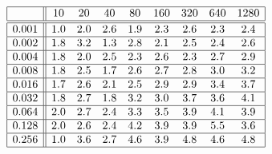 \[
\begin{array}{|c||cccccccc|}
\hline 
& 10 & 20 & 40 & 80 & 160 & 320 & 640 & 1280\\
\hline \hline 
0.001 & 1.0 & 2.0 & 2.6 & 1.9 & 2.3 & 2.6 & 2.3 & 2.4 \\ \hline 
0.002 & 1.8 & 3.2 & 1.3 & 2.8 & 2.1 & 2.5 & 2.4 & 2.6 \\ \hline 
0.004 & 1.8 & 2.0 & 2.5 & 2.3 & 2.6 & 2.3 & 2.7 & 2.9 \\ \hline 
0.008 & 1.8 & 2.5 & 1.7 & 2.6 & 2.7 & 2.8 & 3.0 & 3.2 \\ \hline 
0.016 & 1.7 & 2.6 & 2.1 & 2.5 & 2.9 & 2.9 & 3.4 & 3.7 \\ \hline 
0.032 & 1.8 & 2.7 & 1.8 & 3.2 & 3.0 & 3.7 & 3.6 & 4.1 \\ \hline 
0.064 & 2.0 & 2.7 & 2.4 & 3.3 & 3.5 & 3.9 & 4.1 & 3.9 \\ \hline 
0.128 & 2.0 & 2.6 & 2.4 & 4.2 & 3.9 & 3.9 & 5.5 & 3.6 \\ \hline 
0.256 & 1.0 & 3.6 & 2.7 & 4.6 & 3.9 & 4.8 & 4.6 & 4.8 \\ \hline 
\end{array}
\]


